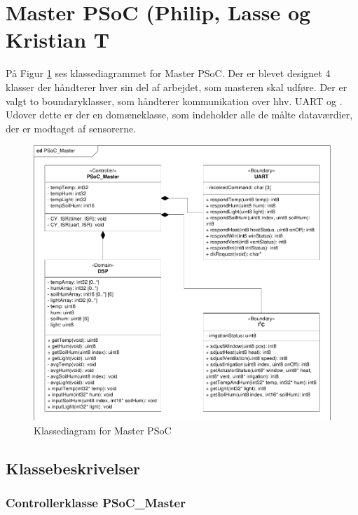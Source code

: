 \section{Master PSoC (Philip, Lasse og Kristian T}

På Figur \ref{fig:Master_PSoC_klassediagram} ses klassediagrammet for Master PSoC. Der er blevet designet 4 klasser der håndterer hver sin del af arbejdet, som masteren skal udføre. Der er valgt to boundaryklasser, som håndterer kommunikation over hhv. UART og \IIC. Udover dette er der en domæneklasse, som indeholder alle de målte dataværdier, der er modtaget af sensorerne. 

\begin{figure}[h]
\centering 
\includegraphics[width={\textwidth}, trim=0 0 0 0, clip=true] {../fig/cd_PSoC_master.pdf}
\caption{Klassediagram for Master PSoC}
\label{fig:Master_PSoC_klassediagram}
\end{figure}

\clearpage

\subsection{Klassebeskrivelser}

\subsubsection{Controllerklasse PSoC\_Master}

